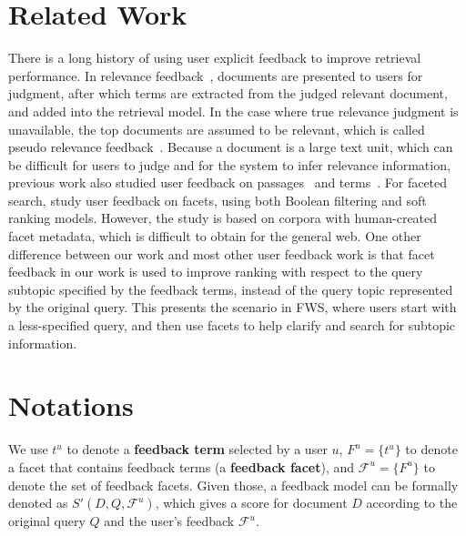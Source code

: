 \section{Related Work}
\label{sec:feedback-related}
There is a long history of using user explicit feedback to improve retrieval performance. In relevance feedback~\cite{rocchio71relevance,salton1997improving}, documents are presented to users for judgment, after which terms are extracted from the judged relevant document, and added into the retrieval model. In the case where true relevance judgment is unavailable, the top documents are assumed to be relevant, which is called pseudo relevance feedback~\cite{buckley1995automatic,abdul2004umass}. Because a document is a large text unit, which can be difficult for users to judge and for the system to infer relevance information, previous work also studied user feedback on passages~\cite{allan1995relevance,xu1996query} and terms~\cite{koenemann1996case,tan2007term}. For faceted search, \citet{zhang2010interactive} study user feedback on facets, using both Boolean filtering and soft ranking models. However, the study is based on corpora with human-created facet metadata, which is difficult to obtain for the general web.  One other difference between our work and most other user feedback work is that facet feedback in our work is used to improve ranking with respect to the query subtopic specified by the feedback terms, instead of the query topic represented by the original query. This presents the scenario in FWS, where users start with a less-specified query, and then use facets to help clarify and search for subtopic information.

\section{Notations} \label{sec:fdbk-notations}
We use $t^u$ to denote a \textbf{feedback term} selected by a user $u$, $F^u=\{t^u\}$ to denote a facet that contains feedback terms (a \textbf{feedback facet}), and $\mathcal{F}^u=\{F^u\}$ to denote the set of feedback facets. Given those, a feedback model can be formally denoted as $S'(D,Q,\mathcal{F}^u)$, which gives a score for document $D$ according to the original query $Q$ and the user's feedback $\mathcal{F}^u$. 

